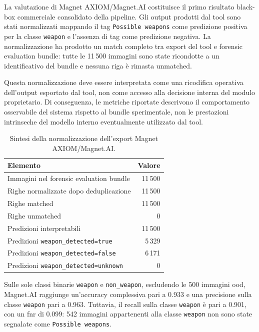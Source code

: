 La valutazione di Magnet AXIOM/Magnet.AI costituisce il primo risultato
black-box commerciale consolidato della pipeline. Gli output prodotti dal tool
sono stati normalizzati mappando il tag \texttt{Possible weapons} come
predizione positiva per la classe \texttt{weapon} e l'assenza di tag come
predizione negativa. La normalizzazione ha prodotto un match completo tra export
del tool e forensic evaluation bundle: tutte le 11\,500 immagini sono state
ricondotte a un identificativo del bundle e nessuna riga è rimasta unmatched.

Questa normalizzazione deve essere interpretata come una ricodifica operativa
dell'output esportato dal tool, non come accesso alla decisione interna del
modulo proprietario. Di conseguenza, le metriche riportate descrivono il
comportamento osservabile del sistema rispetto al bundle sperimentale, non le
prestazioni intrinseche del modello interno eventualmente utilizzato dal tool.


\begin{table}[H]
\centering
\caption{Sintesi della normalizzazione dell'export Magnet AXIOM/Magnet.AI.}
\label{tab:results-magnet-normalization-summary}
\small
\begin{tabular}{lr}
\toprule
\textbf{Elemento} & \textbf{Valore} \\
\midrule
Immagini nel forensic evaluation bundle & 11\,500 \\
Righe normalizzate dopo deduplicazione & 11\,500 \\
Righe matched & 11\,500 \\
Righe unmatched & 0 \\
Predizioni interpretabili & 11\,500 \\
Predizioni \texttt{weapon\_detected=true} & 5\,329 \\
Predizioni \texttt{weapon\_detected=false} & 6\,171 \\
Predizioni \texttt{weapon\_detected=unknown} & 0 \\
\bottomrule
\end{tabular}
\end{table}

Sulle sole classi binarie \texttt{weapon} e \texttt{non\_weapon}, escludendo le
500 immagini \gls{ood}, Magnet.AI raggiunge un'accuracy complessiva pari a
0.933 e una precisione sulla classe \texttt{weapon} pari a 0.963. Tuttavia, il
recall sulla classe \texttt{weapon} è pari a 0.901, con un \gls{fnr} di 0.099:
542 immagini appartenenti alla classe \texttt{weapon} non sono state segnalate
come \texttt{Possible weapons}.

